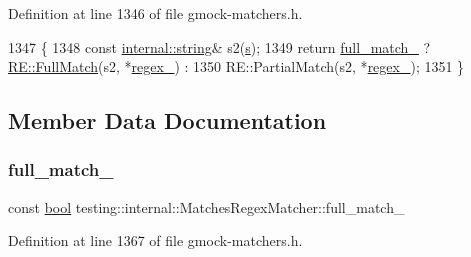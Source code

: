 Definition at line 1346 of file gmock-\/matchers.\+h.


\begin{DoxyCode}
1347                                                      \{
1348     \textcolor{keyword}{const} \hyperlink{namespacetesting_1_1internal_a8e8ff5b11e64078831112677156cb111}{internal::string}& s2(\hyperlink{namespaceservice__node__3_aa976421a49e0b54f23833423400849ae}{s});
1349     \textcolor{keywordflow}{return} \hyperlink{classtesting_1_1internal_1_1MatchesRegexMatcher_ac2690d696a5a1ec134a90c5cc21b2072}{full\_match\_} ? \hyperlink{classtesting_1_1internal_1_1RE_aa79a950758d0f1d62f7762d1e9cefe86}{RE::FullMatch}(s2, *\hyperlink{classtesting_1_1internal_1_1MatchesRegexMatcher_a585228fef5cc1158f064aa4f3eaf882e}{regex\_}) :
1350         RE::PartialMatch(s2, *\hyperlink{classtesting_1_1internal_1_1MatchesRegexMatcher_a585228fef5cc1158f064aa4f3eaf882e}{regex\_});
1351   \}
\end{DoxyCode}


\subsection{Member Data Documentation}
\mbox{\label{classtesting_1_1internal_1_1MatchesRegexMatcher_ac2690d696a5a1ec134a90c5cc21b2072}} 
\subsubsection{\texorpdfstring{full\+\_\+match\+\_\+}{full\_match\_}}
{\footnotesize\ttfamily const \hyperlink{classbool}{bool} testing\+::internal\+::\+Matches\+Regex\+Matcher\+::full\+\_\+match\+\_\+\hspace{0.3cm}{\ttfamily [private]}}



Definition at line 1367 of file gmock-\/matchers.\+h.

\mbox{\label{classtesting_1_1internal_1_1MatchesRegexMatcher_a585228fef5cc1158f064aa4f3eaf882e}} 
